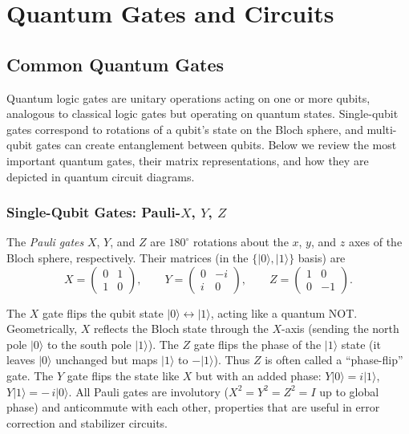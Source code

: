 \section{Quantum Gates and Circuits}
\label{sec:quantum-gates-and-circuits}
\subsection{Common Quantum Gates}

Quantum logic gates are unitary operations acting on one or more qubits, analogous to classical logic gates but operating on quantum states.\cite{NielsenChuang2010} Single-qubit gates correspond to rotations of a qubit’s state on the Bloch sphere, and multi-qubit gates can create entanglement between qubits.\cite{Barenco1995elementary} Below we review the most important quantum gates, their matrix representations, and how they are depicted in quantum circuit diagrams.\cite{Koch2022quantikz}

\subsubsection*{Single-Qubit Gates: Pauli-$X$, $Y$, $Z$}

The \emph{Pauli gates} \(X\), \(Y\), and \(Z\) are \(180^{\circ}\) rotations about the
\(x\), \(y\), and \(z\) axes of the Bloch sphere, respectively\cite{NielsenChuang2010}.
Their matrices (in the \(\{|0\rangle,|1\rangle\}\) basis) are
\[
  X = \begin{pmatrix}0&1\\1&0\end{pmatrix}, \qquad
  Y = \begin{pmatrix}0&-i\\ i&0\end{pmatrix}, \qquad
  Z = \begin{pmatrix}1&0\\0&-1\end{pmatrix}.
\]


The $X$ gate flips the qubit state $|0\rangle \leftrightarrow |1\rangle$, acting like a quantum NOT.\cite{NCFlips} Geometrically, $X$ reflects the Bloch state through the $X$-axis (sending the north pole $|0\rangle$ to the south pole $|1\rangle$).\cite{Bloch1946} The $Z$ gate flips the phase of the $|1\rangle$ state (it leaves $|0\rangle$ unchanged but maps $|1\rangle$ to $-|1\rangle$).\cite{PhaseFlip} Thus $Z$ is often called a “phase-flip” gate.\cite{PhaseFlip} The $Y$ gate flips the state like $X$ but with an added phase: $Y|0\rangle = i|1\rangle$, $Y|1\rangle = -\,i|0\rangle$.\cite{NCFlips} All Pauli gates are involutory ($X^2=Y^2=Z^2=I$ up to global phase) and anticommute with each other, properties that are useful in error correction and stabilizer circuits.\cite{Gottesman1997stabilizer}


